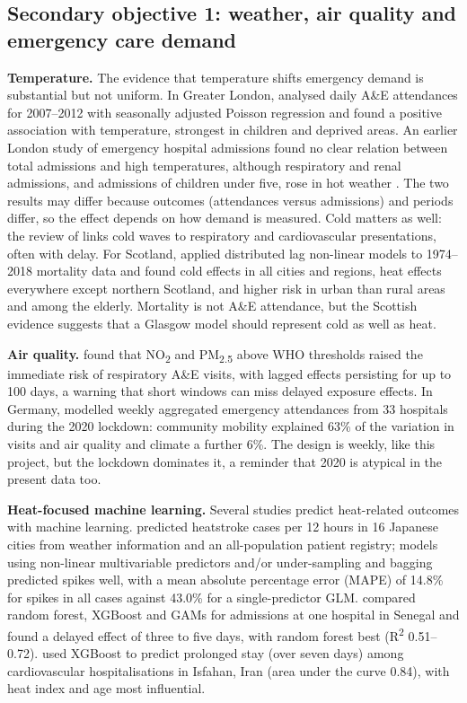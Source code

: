 \documentclass[12pt]{article}
\begin{document}
\subsection{Secondary objective 1: weather, air quality and emergency care demand}
\textbf{Temperature.} The evidence that temperature shifts emergency demand is substantial but not uniform. In Greater London, \textcite{corcuerahotz2020} analysed daily A\&E attendances for 2007--2012 with seasonally adjusted Poisson regression and found a positive association with temperature, strongest in children and deprived areas. An earlier London study of emergency hospital admissions found no clear relation between total admissions and high temperatures, although respiratory and renal admissions, and admissions of children under five, rose in hot weather \parencite{kovats2004}. The two results may differ because outcomes (attendances versus admissions) and periods differ, so the effect depends on how demand is measured. Cold matters as well: the review of \textcite{poshtmashhadi2025} links cold waves to respiratory and cardiovascular presentations, often with delay. For Scotland, \textcite{wan2022} applied distributed lag non-linear models to 1974--2018 mortality data and found cold effects in all cities and regions, heat effects everywhere except northern Scotland, and higher risk in urban than rural areas and among the elderly. Mortality is not A\&E attendance, but the Scottish evidence suggests that a Glasgow model should represent cold as well as heat.

\textbf{Air quality.} \textcite{mebrahtu2023} found that NO\textsubscript{2} and PM\textsubscript{2.5} above WHO thresholds raised the immediate risk of respiratory A\&E visits, with lagged effects persisting for up to 100 days, a warning that short windows can miss delayed exposure effects. In Germany, \textcite{weismann2023} modelled weekly aggregated emergency attendances from 33 hospitals during the 2020 lockdown: community mobility explained 63\% of the variation in visits and air quality and climate a further 6\%. The design is weekly, like this project, but the lockdown dominates it, a reminder that 2020 is atypical in the present data too.

\textbf{Heat-focused machine learning.} Several studies predict heat-related outcomes with machine learning. \textcite{ogata2021} predicted heatstroke cases per 12 hours in 16 Japanese cities from weather information and an all-population patient registry; models using non-linear multivariable predictors and/or under-sampling and bagging predicted spikes well, with a mean absolute percentage error (MAPE) of 14.8\% for spikes in all cases against 43.0\% for a single-predictor GLM. \textcite{toure2025} compared random forest, XGBoost and GAMs for admissions at one hospital in Senegal and found a delayed effect of three to five days, with random forest best (R\textsuperscript{2} 0.51--0.72). \textcite{javari2026} used XGBoost to predict prolonged stay (over seven days) among cardiovascular hospitalisations in Isfahan, Iran (area under the curve 0.84), with heat index and age most influential.
\end{document}
